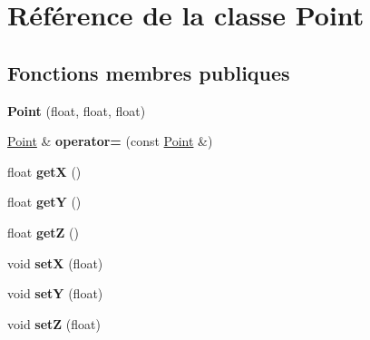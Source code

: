 \hypertarget{classPoint}{\section{Référence de la classe Point}
\label{classPoint}
}
\subsection*{Fonctions membres publiques}
\begin{DoxyCompactItemize}
\item 
\hypertarget{classPoint_a326edb72707d198c949cde90dcd3557a}{{\bfseries Point} (float, float, float)}\label{classPoint_a326edb72707d198c949cde90dcd3557a}

\item 
\hypertarget{classPoint_aecfc6968998d806384e24cd93072b024}{\hyperlink{classPoint}{Point} \& {\bfseries operator=} (const \hyperlink{classPoint}{Point} \&)}\label{classPoint_aecfc6968998d806384e24cd93072b024}

\item 
\hypertarget{classPoint_acc27466778cc87a662bba40268c4c0c8}{float {\bfseries get\-X} ()}\label{classPoint_acc27466778cc87a662bba40268c4c0c8}

\item 
\hypertarget{classPoint_a3cccbca94719ddde353cce86ce0e2f64}{float {\bfseries get\-Y} ()}\label{classPoint_a3cccbca94719ddde353cce86ce0e2f64}

\item 
\hypertarget{classPoint_adfd464bbfabdcecdcc14eb83cf6d2830}{float {\bfseries get\-Z} ()}\label{classPoint_adfd464bbfabdcecdcc14eb83cf6d2830}

\item 
\hypertarget{classPoint_a61253b28283b54a9cf379132bdff3006}{void {\bfseries set\-X} (float)}\label{classPoint_a61253b28283b54a9cf379132bdff3006}

\item 
\hypertarget{classPoint_a0a9d3529888cd2fd7c0adb8e46702110}{void {\bfseries set\-Y} (float)}\label{classPoint_a0a9d3529888cd2fd7c0adb8e46702110}

\item 
\hypertarget{classPoint_acaf34d6d8ca4ef7e50c6d75ff54f9516}{void {\bfseries set\-Z} (float)}\label{classPoint_acaf34d6d8ca4ef7e50c6d75ff54f9516}

\end{DoxyCompactItemize}
